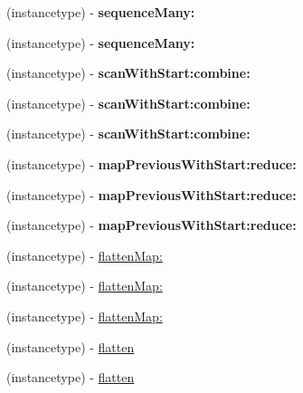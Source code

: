 \begin{DoxyCompactItemize}
(instancetype) -\/ {\bfseries sequence\+Many\+:}
\item 
\mbox{\label{interface_r_a_c_stream_a4c7538547d03c835dbe8fa457cfe9312}} 
(instancetype) -\/ {\bfseries sequence\+Many\+:}
\item 
\mbox{\label{interface_r_a_c_stream_a788aca316c8bc84235e1692f47229647}} 
(instancetype) -\/ {\bfseries scan\+With\+Start\+:combine\+:}
\item 
\mbox{\label{interface_r_a_c_stream_a788aca316c8bc84235e1692f47229647}} 
(instancetype) -\/ {\bfseries scan\+With\+Start\+:combine\+:}
\item 
\mbox{\label{interface_r_a_c_stream_a788aca316c8bc84235e1692f47229647}} 
(instancetype) -\/ {\bfseries scan\+With\+Start\+:combine\+:}
\item 
\mbox{\label{interface_r_a_c_stream_a2fdc837005c8c163afa1af126888ca83}} 
(instancetype) -\/ {\bfseries map\+Previous\+With\+Start\+:reduce\+:}
\item 
\mbox{\label{interface_r_a_c_stream_a2fdc837005c8c163afa1af126888ca83}} 
(instancetype) -\/ {\bfseries map\+Previous\+With\+Start\+:reduce\+:}
\item 
\mbox{\label{interface_r_a_c_stream_a2fdc837005c8c163afa1af126888ca83}} 
(instancetype) -\/ {\bfseries map\+Previous\+With\+Start\+:reduce\+:}
\item 
(instancetype) -\/ \mbox{\hyperlink{interface_r_a_c_stream_a2441b0306adc6ae2845219f8b116119a}{flatten\+Map\+:}}
\item 
(instancetype) -\/ \mbox{\hyperlink{interface_r_a_c_stream_a2441b0306adc6ae2845219f8b116119a}{flatten\+Map\+:}}
\item 
(instancetype) -\/ \mbox{\hyperlink{interface_r_a_c_stream_a2441b0306adc6ae2845219f8b116119a}{flatten\+Map\+:}}
\item 
(instancetype) -\/ \mbox{\hyperlink{interface_r_a_c_stream_a02767823dfe3d4682709e066e15e388c}{flatten}}
\item 
(instancetype) -\/ \mbox{\hyperlink{interface_r_a_c_stream_a02767823dfe3d4682709e066e15e388c}{flatten}}

\end{DoxyCompactItemize}
